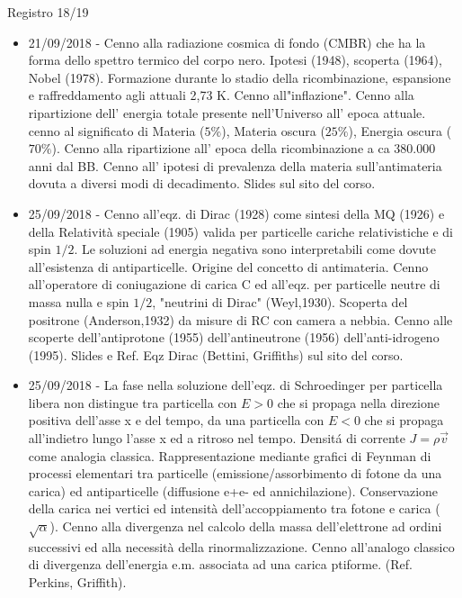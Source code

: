 \begin{frame}[allowframebreaks]{Registro 18/19}
\begin{itemize}
\item 21/09/2018 - Cenno alla radiazione cosmica di fondo (CMBR) che ha la forma dello spettro termico del corpo nero. Ipotesi (1948), scoperta (1964), Nobel (1978). Formazione durante lo stadio della ricombinazione, espansione e raffreddamento agli attuali 2,73 K. Cenno all"inflazione". Cenno alla ripartizione dell' energia totale presente nell'Universo all' epoca attuale. cenno al significato di Materia ($5\%$), Materia oscura ($25\%$), Energia oscura ($70\%$). Cenno alla ripartizione all' epoca della ricombinazione a ca 380.000 anni dal BB. Cenno all' ipotesi di prevalenza della materia sull'antimateria dovuta a diversi modi di decadimento. Slides sul sito del corso.
\item 25/09/2018 - Cenno all'eqz. di Dirac (1928) come sintesi della MQ (1926) e della Relatività speciale (1905) valida per particelle cariche relativistiche e di spin $1/2$. Le soluzioni ad energia negativa sono interpretabili come dovute all'esistenza di antiparticelle. Origine del concetto di antimateria. Cenno all'operatore di coniugazione di carica C ed all'eqz. per particelle neutre di massa nulla e spin $1/2$, "neutrini di Dirac" (Weyl,1930). Scoperta del positrone (Anderson,1932) da misure di RC con camera a nebbia. Cenno alle scoperte dell'antiprotone (1955) dell'antineutrone (1956) dell'anti-idrogeno (1995). Slides e Ref. Eqz Dirac (Bettini, Griffiths) sul sito del corso.
\item 25/09/2018 - La fase nella soluzione dell'eqz. di Schroedinger per particella libera non distingue tra particella con $E>0$ che si propaga nella direzione positiva dell'asse x e del tempo, da una particella con $E<0$ che si propaga all'indietro lungo l'asse x ed a ritroso nel tempo. Densit\'a di corrente $J=\rho\vec{v}$ come analogia classica. Rappresentazione mediante grafici di Feynman di processi elementari tra particelle (emissione/assorbimento di fotone da una carica) ed antiparticelle (diffusione e+e- ed annichilazione). Conservazione della carica nei vertici ed intensità dell'accoppiamento tra fotone e carica ($\sqrt{\alpha}$). Cenno alla divergenza nel calcolo della massa dell'elettrone ad ordini successivi ed alla necessità della rinormalizzazione. Cenno all'analogo classico di divergenza dell'energia e.m. associata ad una carica ptiforme. (Ref. Perkins, Griffith).

\end{itemize}
\end{frame}
